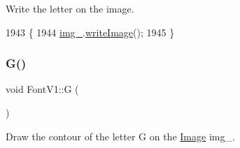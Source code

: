 Write the letter on the image. 


\begin{DoxyCode}
1943                           \{
1944     \mbox{\hyperlink{class_font_v1_a00569e3e3c4b70f437b63f396f735fb0}{img\_}}.\mbox{\hyperlink{class_image_ac34bdffd357a50025e6a72deb02596b5}{writeImage}}();
1945 \}
\end{DoxyCode}
\mbox{\label{class_font_v1_a9806041ba05556826ba6b4a0760fcee4}} 
\subsubsection{\texorpdfstring{G()}{G()}}
{\footnotesize\ttfamily void Font\+V1\+::G (\begin{DoxyParamCaption}{ }\end{DoxyParamCaption})}



Draw the contour of the letter G on the \mbox{\hyperlink{class_image}{Image}} img\+\_\+. 


